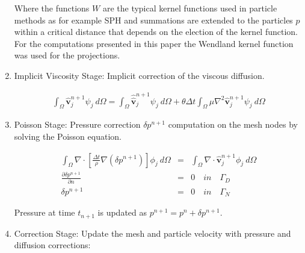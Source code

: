 \documentclass[a4paper,conference]{IEEEtran}
\begin{document}
\begin{enumerate}
Where the functions $W$ are the typical kernel functions used in particle methods as for example SPH\cite{Mon77} and summations are extended to the particles $p$ within a critical distance that depends on the election of the kernel function. For the computations presented in this paper the Wendland kernel function\cite{Wendland} was used for the projections.

  \item Implicit Viscosity Stage: Implicit correction of the viscous diffusion.

\begin{scriptsize}
 \begin{eqnarray}\label{Step4a}
\displaystyle \int_{\Omega} \widehat{\mathbf{v}}^{n+1}_{j}\psi_j\ d\Omega =\int_{\Omega} \widehat{\widehat{\mathbf{v}}}^{n+1}_{j}\psi_j\  d\Omega + \theta \Delta t \int_{\Omega} \mu \nabla^{2}\widehat{\mathbf{v}}^{n+1}_{j} \psi_j\ d\Omega
\end{eqnarray}
\end{scriptsize}


 \item Poisson Stage: Pressure correction $\delta p^{n+1}$ computation on the mesh nodes by solving the Poisson equation.

\begin{scriptsize}
 \begin{eqnarray}\label{Step5a}
   \int_{\Omega} \nabla \cdot \left[\frac{\Delta t}{\rho}\nabla(\delta p^{n+1})\right] \phi_j\ d\Omega &=& \int_{\Omega} \nabla \cdot \widehat{\mathbf{v}}_j^{n+1} \phi_j\ d\Omega \\
   \frac{\partial \delta p^{n+1}}{\partial n} &=& 0 \quad in \quad \Gamma_D \\
   \delta p^{n+1} &=& 0 \quad in \quad \Gamma_N
 \end{eqnarray}
 \end{scriptsize}

 Pressure at time $t_{n+1}$ is updated as $p^{n+1}=p^{n}+\delta p^{n+1}$.


 \item Correction Stage: Update the mesh and particle velocity with pressure and diffusion corrections:


\end{enumerate}
\end{document}

